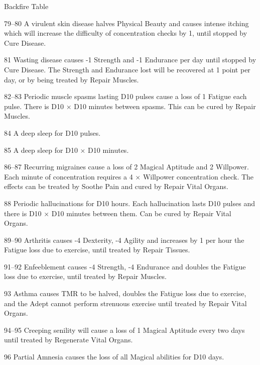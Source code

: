 \begin{Chapter}{Backfire Table}
\begin{Description}
\item[79–80] A virulent skin disease halves Physical Beauty and causes
  intense itching which will increase the difficulty of concentration
  checks by 1, until stopped by Cure Disease.

\item[81] Wasting disease causes -1 Strength and -1 Endurance per day
  until stopped by Cure Disease. The Strength and Endurance lost will
  be recovered at 1 point per day, or by being treated by Repair
  Muscles.

\item[82–83] Periodic muscle spasms lasting D10 pulses cause a loss of
  1 Fatigue each pulse. There is D10 × D10 minutes between
  spasms. This can be cured by Repair Muscles.

\item[84] A deep sleep for D10 pulses.


\item[85] A deep sleep for D10 × D10 minutes.

\item[86–87] Recurring migraines cause a loss of 2 Magical Aptitude
  and 2 Willpower. Each minute of concentration requires a 4 ×
  Willpower concentration check. The effects can be treated by Soothe
  Pain and cured by Repair Vital Organs.

\item[88] Periodic hallucinations for D10 hours.  Each hallucination
  lasts D10 pulses and there is D10 × D10 minutes between them. Can be
  cured by Repair Vital Organs.


\item[89–90] Arthritis causes -4 Dexterity, -4 Agility and increases
  by 1 per hour the Fatigue loss due to exercise, until treated by
  Repair Tissues.

\item[91–92] Enfeeblement causes -4 Strength, -4 Endurance and doubles
  the Fatigue loss due to exercise, until treated by Repair Muscles.

\item[93] Asthma causes TMR to be halved, doubles the Fatigue loss due
  to exercise, and the Adept cannot perform strenuous exercise until
  treated by Repair Vital Organs.

\item[94–95] Creeping senility will cause a loss of 1 Magical Aptitude
  every two days until treated by Regenerate Vital Organs.

\item[96] Partial Amnesia causes the loss of all Magical abilities for
  D10 days.


\end{Description}
\end{Chapter}
